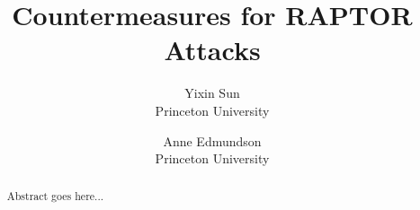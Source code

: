 \documentclass{acm_proc_article-sp}
\begin{document}
\date{}

\title{\Large \bf Countermeasures for RAPTOR Attacks}
\author{
 {\rm Yixin Sun}\\
 Princeton University
 \and
 {\rm Anne Edmundson}\\
 Princeton University
} %

\maketitle

\begin{abstract}
Abstract goes here...
\end{abstract}











{\footnotesize 
}

\end{document}
